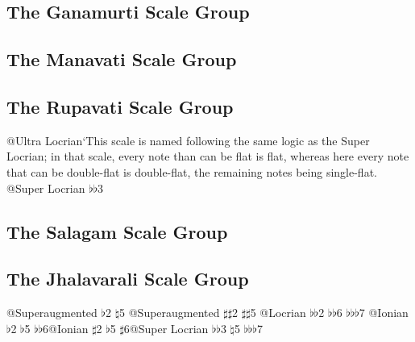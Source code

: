 \documentclass[english]{./gbook}
\begin{document}
\begin{large}
\subsection{The Ganamurti Scale Group}

\subsection{The Manavati Scale Group}

\subsection{The Rupavati Scale Group}
@Ultra Locrian`This scale is named following the same logic as the Super Locrian; in that scale, every note than can be flat is flat, whereas here every note that can be double-flat is double-flat, the remaining notes being single-flat.
@Super Locrian $\flat\flat$3%

\subsection{The Salagam Scale Group}

\subsection{The Jhalavarali Scale Group}
@Superaugmented $\flat$2 $\natural$5
@Superaugmented $\sharp\sharp$2 $\sharp\sharp$5
@Locrian $\flat\flat$2 $\flat\flat$6 $\flat\flat\flat$7
@Ionian $\flat$2 $\flat$5 $\flat\flat$6@Ionian $\sharp$2 $\flat$5 $\sharp$6@Super Locrian $\flat\flat$3 $\natural$5 $\flat\flat\flat$7%


\end{large}
\end{document}
